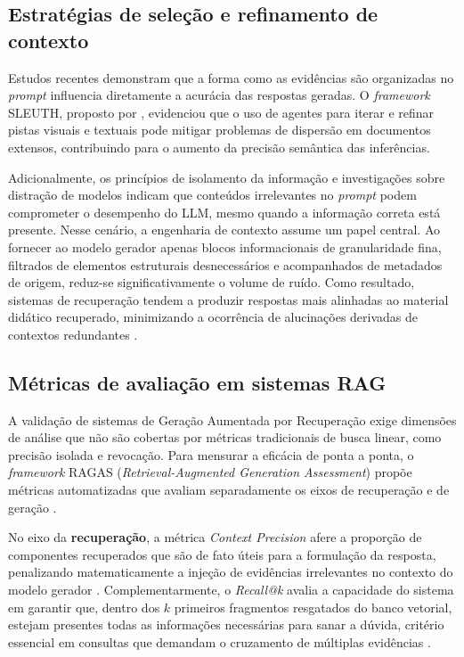 \subsection{Estratégias de seleção e refinamento de contexto}
\label{subsec:estrategias_refinamento_contexto}

Estudos recentes demonstram que a forma como as evidências são organizadas no \textit{prompt} influencia diretamente a acurácia das respostas geradas. O \textit{framework} SLEUTH, proposto por , evidenciou que o uso de agentes para iterar e refinar pistas visuais e textuais pode mitigar problemas de dispersão em documentos extensos, contribuindo para o aumento da precisão semântica das inferências.

Adicionalmente, os princípios de isolamento da informação  e investigações sobre distração de modelos  indicam que conteúdos irrelevantes no \textit{prompt} podem comprometer o desempenho do LLM, mesmo quando a informação correta está presente. Nesse cenário, a engenharia de contexto assume um papel central. Ao fornecer ao modelo gerador apenas blocos informacionais de granularidade fina, filtrados de elementos estruturais desnecessários e acompanhados de metadados de origem, reduz-se significativamente o volume de ruído. Como resultado, sistemas de recuperação tendem a produzir respostas mais alinhadas ao material didático recuperado, minimizando a ocorrência de alucinações derivadas de contextos redundantes .

\subsection{Métricas de avaliação em sistemas RAG}
\label{subsec:metricas_rag}

A validação de sistemas de Geração Aumentada por Recuperação exige dimensões de análise que não são cobertas por métricas tradicionais de busca linear, como precisão isolada e revocação. Para mensurar a eficácia de ponta a ponta, o \textit{framework} RAGAS (\textit{Retrieval-Augmented Generation Assessment}) propõe métricas automatizadas que avaliam separadamente os eixos de recuperação e de geração .

No eixo da \textbf{recuperação}, a métrica \textit{Context Precision} afere a proporção de componentes recuperados que são de fato úteis para a formulação da resposta, penalizando matematicamente a injeção de evidências irrelevantes no contexto do modelo gerador . Complementarmente, o \textit{Recall@k} avalia a capacidade do sistema em garantir que, dentro dos $k$ primeiros fragmentos resgatados do banco vetorial, estejam presentes todas as informações necessárias para sanar a dúvida, critério essencial em consultas que demandam o cruzamento de múltiplas evidências .


